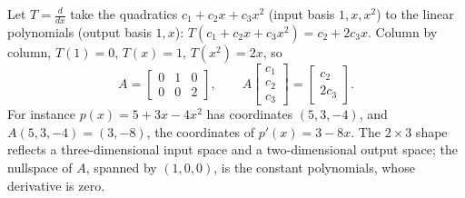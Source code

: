 \begin{example}\label{ex:u34-derivative}
Let $T=\frac{d}{dx}$ take the quadratics $c_1+c_2x+c_3x^2$ (input basis $1,x,x^2$) to the linear
polynomials (output basis $1,x$): $T(c_1+c_2x+c_3x^2)=c_2+2c_3x$. Column by column,
$T(1)=0$, $T(x)=1$, $T(x^2)=2x$, so
\[
  A=\begin{bmatrix}0&1&0\\0&0&2\end{bmatrix},\qquad
  A\begin{bmatrix}c_1\\c_2\\c_3\end{bmatrix}=\begin{bmatrix}c_2\\2c_3\end{bmatrix}.
\]
For instance $p(x)=5+3x-4x^2$ has coordinates $(5,3,-4)$, and $A(5,3,-4)=(3,-8)$, the coordinates
of $p'(x)=3-8x$. The $2\times3$ shape reflects a three-dimensional input space and a
two-dimensional output space; the nullspace of $A$, spanned by $(1,0,0)$, is the constant
polynomials, whose derivative is zero.
\end{example}

